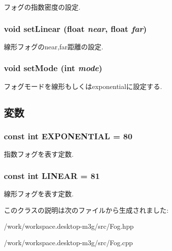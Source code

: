 フォグの指数密度の設定. \hypertarget{classm3g_1_1Fog_a46fd556865ae7f1c683c3741b68c168}{
\subsubsection[{setLinear}]{\setlength{\rightskip}{0pt plus 5cm}void setLinear (float {\em near}, \/  float {\em far})}}
\label{classm3g_1_1Fog_a46fd556865ae7f1c683c3741b68c168}


線形フォグのnear,far距離の設定. \hypertarget{classm3g_1_1Fog_9f407b18ba6235cb96fa95611c1ea3a4}{
\subsubsection[{setMode}]{\setlength{\rightskip}{0pt plus 5cm}void setMode (int {\em mode})}}
\label{classm3g_1_1Fog_9f407b18ba6235cb96fa95611c1ea3a4}


フォグモードを線形もしくはexponentialに設定する. 

\subsection{変数}
\hypertarget{classm3g_1_1Fog_86b391da2e58c0448712a10f6609a62c}{
\subsubsection[{EXPONENTIAL}]{\setlength{\rightskip}{0pt plus 5cm}const int {\bf EXPONENTIAL} = 80}}
\label{classm3g_1_1Fog_86b391da2e58c0448712a10f6609a62c}


指数フォグを表す定数. \hypertarget{classm3g_1_1Fog_23ccf193c67257f1be26417041cecb31}{
\subsubsection[{LINEAR}]{\setlength{\rightskip}{0pt plus 5cm}const int {\bf LINEAR} = 81}}
\label{classm3g_1_1Fog_23ccf193c67257f1be26417041cecb31}


線形フォグを表す定数. 

このクラスの説明は次のファイルから生成されました:\begin{CompactItemize}
\item 
/work/workspace.desktop-m3g/src/Fog.hpp\item 
/work/workspace.desktop-m3g/src/Fog.cpp\end{CompactItemize}
